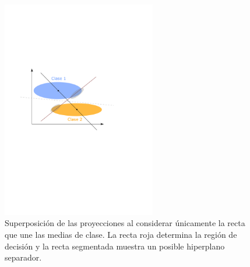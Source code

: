 \begin{figure}[H]
	\centering
	\includegraphics[width=0.6\textwidth]{img/cap6_fisher.pdf}
	\caption{Superposición de las proyecciones al considerar únicamente la recta que une las medias de clase. La recta roja determina la región de decisión y la recta segmentada muestra un posible hiperplano separador.}
	\label{fig:ej_fda_2}
\end{figure}

